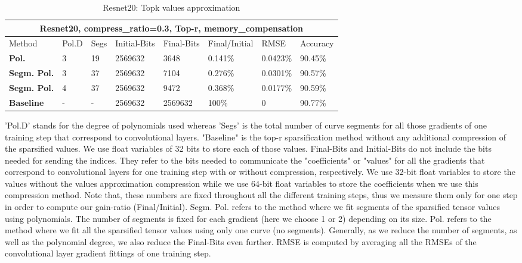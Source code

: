     \begin{table}[h!]
    \footnotesize
     \centering
    \begin{tabular}{ |p{3cm}||p{1cm}|p{1cm}|p{2cm}|p{1.6cm}|p{1.6cm}|p{1.3cm}|p{1.5cm}|}
    \hline
    \multicolumn{8}{|c|}{\textbf{\footnotesize Resnet20, compress\_ratio=0.3, Top-r, memory\_compensation}} \\
    \hline
    \rule{0pt}{3ex}
    	Method & Pol.D & Segs & Initial-Bits &Final-Bits &Final/Initial & RMSE & Accuracy\\
    \hline
    \rule{0pt}{3ex}
    \textbf{Pol.}       & 3 &  19 &  2569632 & 3648   &    0.141\%  &0.0423\%   &90.45\%\\
    \textbf{ Segm. Pol.} & 3 &  37 &  2569632 & 7104   &    0.276\%   &0.0301\%   &90.57\%\\
    \textbf{ Segm. Pol.} & 4 &  37 &  2569632 & 9472   &    0.368\%  &0.0177\%  &90.59\%\\
    \hline
    \rule{0pt}{3ex}
    \textbf{Baseline}   & - &  -  &  2569632 & 2569632 & 100\%  &0  &90.77\%\\
    \hline
    \end{tabular}
    \caption{Resnet20: Topk values approximation}
    'Pol.D' stands for the degree of polynomials used whereas 'Segs' is the total number of curve segments for all those gradients of one training step that correspond to convolutional layers.
    "Baseline" is the top-r sparsification method without any additional compression of the sparsified values. We use float variables of 32 bits to store each of those values.
    Final-Bits and Initial-Bits do not include the bits needed for sending the indices.
    They refer to the bits needed to communicate the "coefficients" or "values"  for all the gradients that correspond to convolutional layers for one training step with or without compression, respectively. We use 32-bit float variables to store the values without the values approximation compression while we use 64-bit float variables to store the coefficients when we use this compression method.
    Note that, these numbers are fixed throughout all the different training steps, thus we measure them only for one step in order to compute our gain-ratio (Final/Initial).
    Segm. Pol. refers to the method where we fit segments of the sparsified tensor values using polynomials.
    The number of segments is fixed for each gradient (here we choose 1 or 2) depending on its size.
    Pol. refers to the method where we fit all the sparsified tensor values using only one curve (no segments).
    Generally, as we reduce the number of segments, as well as the polynomial degree, we also reduce the Final-Bits even further. RMSE is computed by averaging all the RMSEs of the convolutional layer gradient fittings of one training step.
    
    \label{table:5}
    \end{table}
    
    
